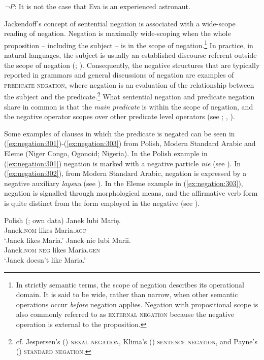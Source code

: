 \documentclass[output=paper,hidelinks]{langscibook}
\begin{document}
\ea
\label{ex:negation:402}
\emph{¬P}: It is not the case that Eva is an experienced astronaut.\\
\z

Jackendoff's concept of sentential negation is associated with a wide-scope reading of negation. Negation is maximally wide-scoping when the whole proposition -- including the subject --  is in the scope of negation.\footnote{In strictly semantic terms, the scope of negation describes its operational domain. It is said to be wide, rather than narrow,  when other semantic operations occur \emph{before} negation applies. Negation with propositional scope is also commonly referred to as \textsc{external negation} because the negative operation is external to the proposition.} In practice, in natural languages, the subject is usually an established discourse referent outside the scope of negation (\citealt {keenan76}; \citealt {Givon:79}). Consequently, the negative structures that are typically reported in grammars and general discussions of negation are examples of \textsc{predicate negation}, where negation is an evaluation of the relationship between the subject and the predicate.\footnote{cf. Jespersen's (\citeyear{Jespersen:17}) \textsc{nexal negation}, Klima's (\citeyear{Klima:64}) \textsc{sentence negation}, and Payne's (\citeyear{Payne:85.1}) \textsc{standard negation}.} What sentential negation and predicate negation share in common is that the \emph{main predicate} is within the scope of negation, and the negative operator scopes over other predicate level operators (see \citealt {Payne:85.1}; \citealt {Acquaviva:97}, \citealt {DeClercq:20}). 

Some examples of clauses in which the predicate is negated can be seen in (\ref{ex:negation:301})-(\ref{ex:negation:303}) from Polish, Modern Standard Arabic and Eleme (Niger Congo, Ogonoid; Nigeria). In the Polish example in (\ref{ex:negation:301}) negation is marked with a negative particle \emph{nie} (see ). In (\ref{ex:negation:302}), from Modern Standard Arabic, negation is expressed by a negative auxiliary \emph{laysuu} (see ). In the Eleme example in (\ref{ex:negation:303}), negation is signalled through morphological means, and the affirmative verb form is quite distinct from the form employed in the negative (see ). 

\ea Polish (\citealt [324]{przepiorkowski2015two}; own data)
\label{ex:negation:301}
\ea
\gll Janek lubi Marię.\\  
     Janek.\textsc{nom} likes Maria.\textsc{acc}\\ 
\glt `Janek likes Maria.'
\ex
\gll Janek nie lubi Marii.\\  
     Janek.\textsc{nom} \textsc{neg} likes Maria.\textsc{gen}\\ 
\glt `Janek doesn't like Maria.'
\z\z
\end{document}
